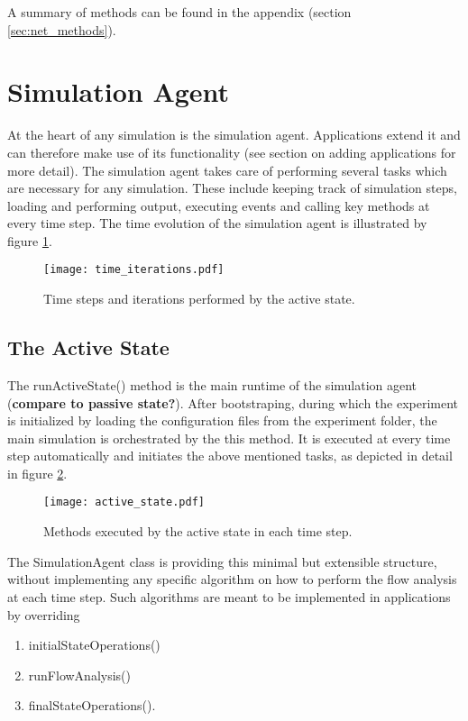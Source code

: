 \documentclass[11pt,fleqn]{book} %
\begin{document}
A summary of methods can be found in the appendix (section \ref{sec:net_methods}).


\section{Simulation Agent}\label{sec:simu_agent}
At the heart of any simulation is the simulation agent. Applications extend it and can therefore make use of its functionality (see section on adding applications for more detail). The simulation agent takes care of performing several tasks which are necessary for any simulation. These include keeping track of simulation steps, loading and performing output, executing events and calling key methods at every time step. The time evolution of the simulation agent is illustrated by figure \ref{fig:time_iter}.

\begin{figure}[!h]
\centering\texttt{[image: time\_iterations.pdf]}
\caption{Time steps and iterations performed by the active state.}
\label{fig:time_iter}
\end{figure}

\subsection{The Active State}
The runActiveState() method is the main runtime of the simulation agent (\textbf{compare to passive state?}). After bootstraping, during which the experiment is initialized by loading the configuration files from the experiment folder, the main simulation is orchestrated by the this method. It is executed at every time step automatically and initiates the above mentioned tasks, as depicted in detail in figure \ref{fig:active_state}.

\begin{figure}[!h]
\centering\texttt{[image: active\_state.pdf]}
\caption{Methods executed by the active state in each time step.}
\label{fig:active_state}
\end{figure}

The SimulationAgent class is providing this minimal but extensible structure, without implementing any specific algorithm on how to perform the flow analysis at each time step. Such algorithms are meant to be implemented in applications by overriding 
\begin{enumerate}
	\item initialStateOperations()
	\item runFlowAnalysis()
	\item finalStateOperations().
\end{enumerate}
\end{document}
